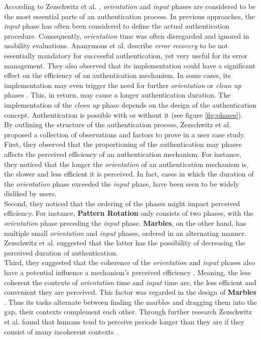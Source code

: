 According to Zezschwitz et al. \cite{Zezschwitz}, \textit{orientation} and \textit{input} phases are considered to be the most essential parts of an authentication process. In previous approaches, the \textit{input} phase has often been considered to define the actual authentication procedure. Consequently, \textit{orientation} time was often disregarded and ignored in usability evaluations. Ananymous et al. \cite{Zezschwitz} describe \textit{error recovery} to be not essentially mandatory for successful authentication, yet very useful for its error management. They also observed that its implementation could have a significant effect on the efficiency of an authentication mechanism. In some cases, its implementation may even trigger the need for further \textit{orientation} or \textit{clean up} phases \cite{Zezschwitz}. This, in return, may cause a longer authentication duration. The implementation of the \textit{clean up} phase depends on the design of the authentication concept. Authentication is possible with or without it (see figure \ref{fig:phases}). \\

By outlining the structure of the authentication process, Zezschwitz et al. \cite{Zezschwitz} proposed a collection of observations and factors to prove in a user case study. First, they observed that the proportioning of the authentication may phases affects the perceived efficiency of an authentication mechanism. For instance, they noticed that the longer the \textit{orientation} of an authentication mechanism is, the slower and less efficient it is perceived. In fact, cases in which the duration of the \textit{orientation} phase exceeded the \textit{input} phase, have been seen to be widely disliked by users. \\

Second, they noticed that the ordering of the phases might impact perceived efficiency. For instance, \textbf{Pattern Rotation} only consists of two phases, with the \textit{orientation} phase preceding the \textit{input} phase. \textbf{Marbles}, on the other hand, has multiple small \textit{orientation} and \textit{input} phases, ordered in an alternating manner. Zezschwitz et al. \cite{Zezschwitz} suggested that the latter has the possibility of decreasing the perceived duration of authentication. \\

Third, they suggested that the coherence of the \textit{orientation} and \textit{input} phases also have a potential influence a mechanism's perceived efficiency \cite{Zezschwitz}. Meaning, the less coherent the contexts of \textit{orientation} time and \textit{input} time are, the less efficient and convenient they are perceived. This factor was regarded in the design of \textbf{Marbles} \cite{Marbles}. Thus its tasks alternate between finding the marbles and dragging them into the gap, their contexts complement each other. Through further research Zezschwitz et al. \cite{Zezschwitz} found that humans tend to perceive periods longer than they are if they consist of many incoherent contexts \cite{Zezschwitz,perception}.\\

